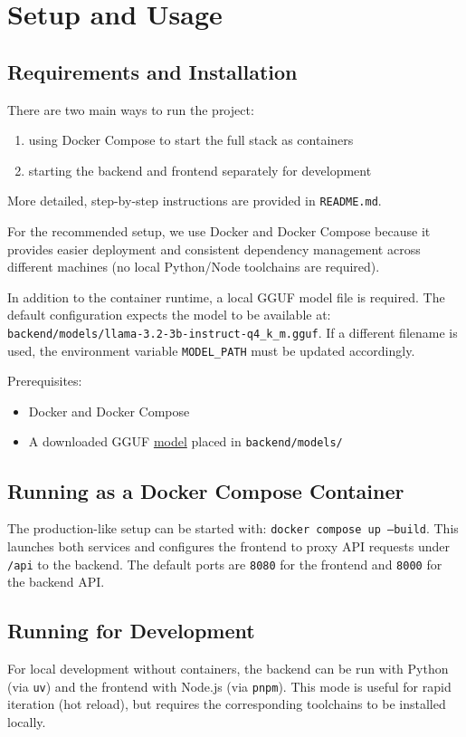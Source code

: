
\section{Setup and Usage}
\subsection{Requirements and Installation }
There are two main ways to run the project:

\begin{enumerate}
    \item using Docker Compose to start the full stack as containers
    \item starting the backend and frontend separately for development
\end{enumerate}

More detailed, step-by-step instructions are provided in \texttt{README.md}.

For the recommended setup, we use Docker and Docker Compose because it provides easier deployment and consistent dependency management across different machines (no local Python/Node toolchains are required).

In addition to the container runtime, a local GGUF model file is required.
The default configuration expects the model to be available at:
\texttt{backend/models/llama-3.2-3b-instruct-q4\_k\_m.gguf}.
If a different filename is used, the environment variable \texttt{MODEL\_PATH} must be updated accordingly.

Prerequisites:
\begin{itemize}
    \item Docker and Docker Compose
    \item A downloaded GGUF \href{https://huggingface.co/hugging-quants/Llama-3.2-3B-Instruct-Q4_K_M-GGUF/resolve/main/llama-3.2-3b-instruct-q4_k_m.gguf?download=true}{model} placed in \texttt{backend/models/}
\end{itemize}

\subsection{Running as a Docker Compose Container}
The production-like setup can be started with:
\texttt{docker compose up --build}.
This launches both services and configures the frontend to proxy API requests under \texttt{/api} to the backend.
The default ports are \texttt{8080} for the frontend and \texttt{8000} for the backend API.

\subsection{Running for Development}
For local development without containers, the backend can be run with Python (via \texttt{uv}) and the frontend with Node.js (via \texttt{pnpm}).
This mode is useful for rapid iteration (hot reload), but requires the corresponding toolchains to be installed locally.